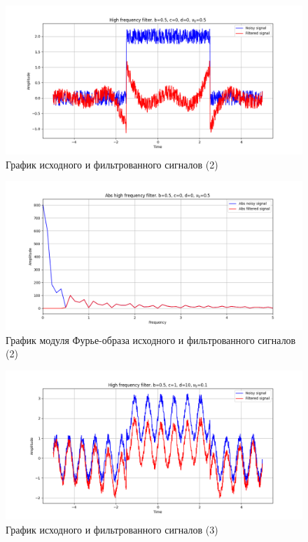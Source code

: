 \documentclass[a4paper, 12pt]{article}
\begin{document}
    \begin{figure}[H]
        \centering
        \includegraphics[scale=0.48]{2_nolow.png}
        \captionsetup{skip=0pt}
        \caption{График исходного и фильтрованного сигналов (2)}
        \label{fig:fig29}
    \end{figure}
    \begin{figure}[H]
        \centering
        \includegraphics[scale=0.48]{2_abs_nolow.png}
        \captionsetup{skip=0pt}
        \caption{График модуля Фурье-образа исходного и фильтрованного сигналов (2)}
        \label{fig:fig30}
    \end{figure}
    \begin{figure}[H]
        \centering
        \includegraphics[scale=0.48]{3_nolow.png}
        \captionsetup{skip=0pt}
        \caption{График исходного и фильтрованного сигналов (3)}
        \label{fig:fig31}
    \end{figure}
\end{document}
